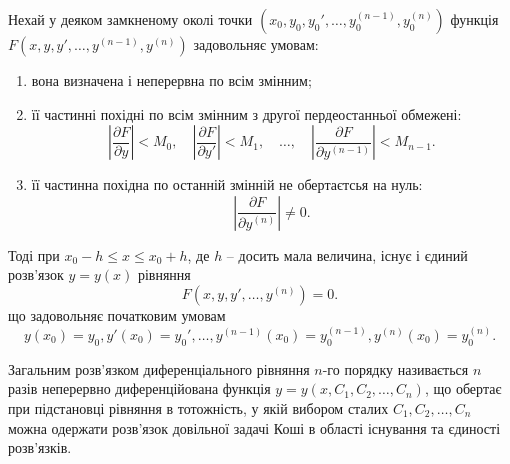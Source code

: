 \begin{theorem}
	Нехай у деяком замкненому околі точки $\left(x_0, y_0, y_0', \ldots, y_0^{(n-1)}, y_0^{(n)}\right)$ функція $F\left(x,y,y',\ldots,y^{(n-1)},y^{(n)}\right)$ задовольняє умовам:
	\begin{enumerate}
		\item вона визначена і неперервна по всім змінним;
		\item її частинні похідні по всім змінним з другої пердеостанньої обмежені:
		\begin{equation*}
			\left|\frac{\partial F}{\partial y}\right| < M_0, \quad \left|\frac{\partial F}{\partial y'}\right| < M_1, \quad \ldots, \quad \left|\frac{\partial F}{\partial y^{(n-1)}}\right| < M_{n-1}.
		\end{equation*}
		\item її частинна похідна по останній змінній не обертаєтсья на нуль: \[\left|\frac{\partial F}{\partial y^{(n)}}\right|\ne0.\]
	\end{enumerate}
	Тоді при $x_0 - h \le x \le x_0 + h$, де $h$ -- досить мала величина, існує і єдиний розв’язок $y=y(x)$ рівняння
    \begin{equation*}
    	F \left( x, y, y', \ldots, y^{(n)} \right) = 0.
    \end{equation*}
    що задовольняє початковим умовам
    \begin{equation*}
    	y(x_0) = y_0, y'(x_0) = y_0', \ldots, y^{(n - 1)} (x_0) = y_0^{(n-1)}, y^{(n)} (x_0) = y_0^{(n)}.
    \end{equation*}
\end{theorem}
\begin{definition}
	Загальним розв’язком диференціального рівняння $n$-го порядку називається $n$ разів неперервно диференційована функція $y=y(x,C_1,C_2,\ldots,C_n)$, що обертає при підстановці рівняння в тотожність, у якій вибором сталих $C_1, C_2, \ldots, C_n$ можна одержати розв’язок довільної задачі Коші в області існування та єдиності розв’язків.
\end{definition}

